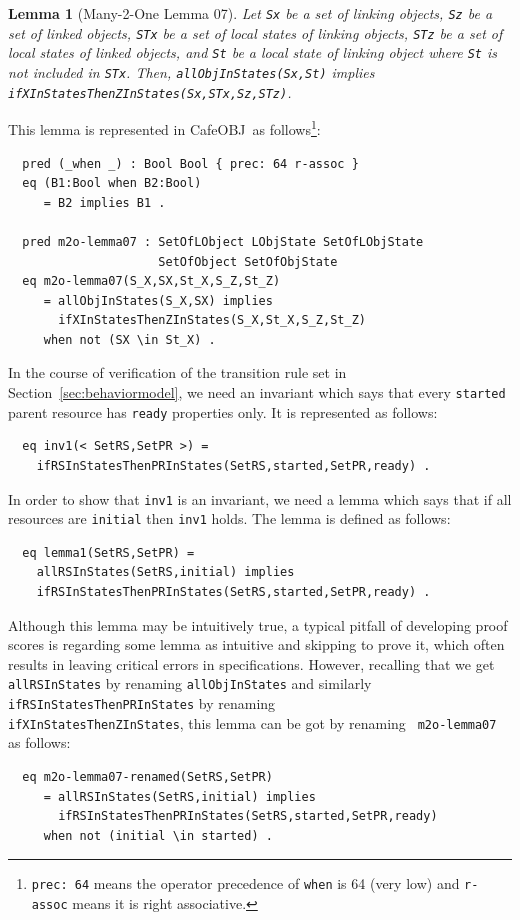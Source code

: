 \documentclass[12pt]{report}
\newtheorem{lemma}{Lemma}
\newcommand{\stt}[1]{{\small{\tt {#1}}}}
\newcommand{\cafeobj}{{\sf CafeOBJ}~}
\begin{document}
\begin{lemma}[Many-2-One Lemma 07]
  Let {\tt Sx} be a set of linking objects, {\tt Sz} be a set of
  linked objects, {\tt STx} be a set of local states of linking
  objects, {\tt STz} be a set of local states of linked objects, and
  {\tt St} be a local state of linking object where {\tt St} is not
  included in {\tt STx}. Then, \stt{allObjInStates(Sx,St)} implies
  \stt{ifXInStatesThenZInStates(Sx,STx,Sz,STz)}.
\end{lemma}
This lemma is represented in \cafeobj as follows\footnote{\stt{prec: 64} 
means the operator precedence of {\tt when} is 64 (very low) and 
{\tt r-assoc} means it is right associative.}:
\begin{verbatim}
  pred (_when _) : Bool Bool { prec: 64 r-assoc }
  eq (B1:Bool when B2:Bool)
     = B2 implies B1 .

  pred m2o-lemma07 : SetOfLObject LObjState SetOfLObjState 
                     SetOfObject SetOfObjState
  eq m2o-lemma07(S_X,SX,St_X,S_Z,St_Z)
     = allObjInStates(S_X,SX) implies 
       ifXInStatesThenZInStates(S_X,St_X,S_Z,St_Z)
     when not (SX \in St_X) .
\end{verbatim}
In the course of verification of the transition rule set in
Section~\ref{sec:behaviormodel}, we need an invariant which says that
every {\tt started} parent resource has {\tt ready} properties
only. It is represented as follows:
\begin{verbatim}
  eq inv1(< SetRS,SetPR >) =
    ifRSInStatesThenPRInStates(SetRS,started,SetPR,ready) .
\end{verbatim}
In order to show that {\tt inv1} is an invariant, we need a lemma
which says that if all resources are {\tt initial} then {\tt inv1}
holds.  The lemma is defined as follows:
\begin{verbatim}
  eq lemma1(SetRS,SetPR) =
    allRSInStates(SetRS,initial) implies
    ifRSInStatesThenPRInStates(SetRS,started,SetPR,ready) .
\end{verbatim}
Although this lemma may be intuitively true, a typical pitfall of
developing proof scores is regarding some lemma as intuitive and
skipping to prove it, which often results in leaving critical errors
in specifications. However, recalling that we get {\tt allRSInStates}
by renaming {\tt allObjInStates} and similarly
{\tt ifRSInStatesThenPRInStates} by renaming\\
{\tt ifXInStatesThenZInStates}, this lemma can be got by renaming {\tt
  m2o-lemma07} as follows:
\begin{verbatim}
  eq m2o-lemma07-renamed(SetRS,SetPR)
     = allRSInStates(SetRS,initial) implies 
       ifRSInStatesThenPRInStates(SetRS,started,SetPR,ready)
     when not (initial \in started) .
\end{verbatim}
\end{document}
